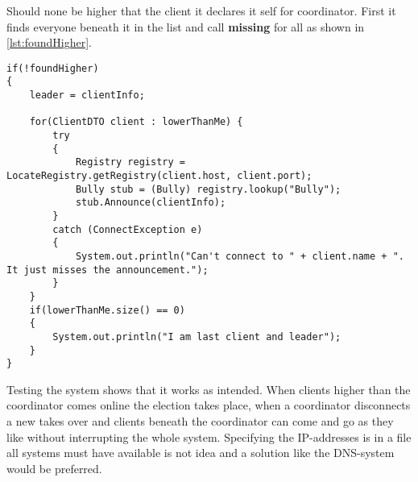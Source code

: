 \documentclass[Main]{subfiles}
\begin{document}
Should none be higher that the client it declares it self for coordinator. 
First it finds everyone beneath it in the list and call \textbf{missing}
for all as shown in \codeTitle \ref{lst:foundHigher}.


\begin{lstlisting}[caption=Client: StartElection(), style=Code-Java, label=lst:foundHigher]
if(!foundHigher)
{
	leader = clientInfo;

	for(ClientDTO client : lowerThanMe) {
		try 
		{
			Registry registry = LocateRegistry.getRegistry(client.host, client.port);
			Bully stub = (Bully) registry.lookup("Bully");
			stub.Announce(clientInfo); 
		}
		catch (ConnectException e) 
		{
			System.out.println("Can't connect to " + client.name + ". It just misses the announcement.");
		}
	}
	if(lowerThanMe.size() == 0)
	{
		System.out.println("I am last client and leader");
	}
}
\end{lstlisting}


Testing the system shows that it works as intended.
When clients higher than the coordinator comes online the election takes place, when a coordinator disconnects a new takes over and clients beneath the coordinator can come and go as they like without interrupting the whole system.
Specifying the IP-addresses is in a file all systems must have available is not idea and a solution like the DNS-system would be preferred\cite[p. 4]{OurDnsReport}.
\end{document}
